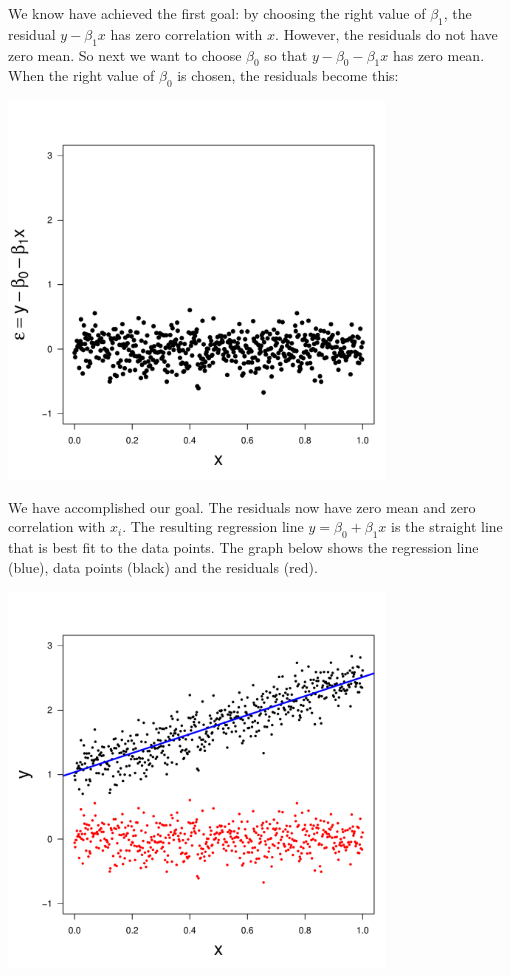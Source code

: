 \documentclass[11pt]{article}
\begin{document}
We know have achieved the first goal: by choosing the right value of $\beta_1$, 
the residual $y-\beta_1 x$ has zero correlation with $x$. However, the residuals 
do not have zero mean. So next we want to choose $\beta_0$ so that 
$y-\beta_0-\beta_1 x$ has zero mean. When the right value of $\beta_0$ is chosen, 
the residuals become this:
\begin{center}
\includegraphics[width=10cm]{residuals.pdf}
\end{center}
We have accomplished our goal. The residuals now have zero mean and zero correlation 
with $x_i$. The resulting regression line $y=\beta_0+\beta_1x$ 
is the straight line that is best fit to the data points. The graph below 
shows the regression line (blue), data points (black) and the residuals (red). 
\begin{center}
\includegraphics[width=10cm]{regressionLine.pdf}
\end{center}
\end{document}
